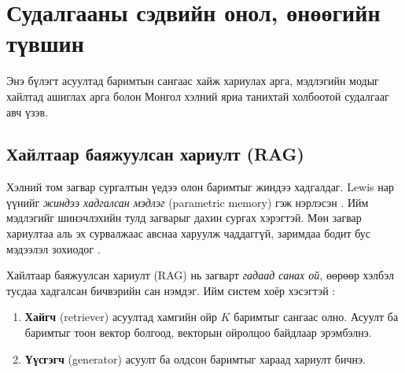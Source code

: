 \chapter{Судалгааны сэдвийн онол, өнөөгийн түвшин}
\label{ch:literature}

%

Энэ бүлэгт асуултад баримтын сангаас хайж хариулах арга, мэдлэгийн модыг хайлтад ашиглах арга болон Монгол хэлний яриа танихтай холбоотой судалгааг авч үзэв.

\section{Хайлтаар баяжуулсан хариулт (RAG)}
\label{sec:lit-rag}

Хэлний том загвар сургалтын үедээ олон баримтыг жиндээ хадгалдаг. Lewis нар үүнийг \textit{жиндээ хадгалсан мэдлэг} (parametric memory) гэж нэрлэсэн \cite{lewis2020rag}. Ийм мэдлэгийг шинэчлэхийн тулд загварыг дахин сургах хэрэгтэй. Мөн загвар хариултаа аль эх сурвалжаас авснаа харуулж чаддаггүй, заримдаа бодит бус мэдээлэл зохиодог \cite{lewis2020rag}.

Хайлтаар баяжуулсан хариулт (RAG) нь загварт \textit{гадаад санах ой}, өөрөөр хэлбэл тусдаа хадгалсан бичвэрийн сан нэмдэг. Ийм систем хоёр хэсэгтэй \cite{lewis2020rag}:
\begin{enumerate}
    \item \textbf{Хайгч} (retriever) асуултад хамгийн ойр $K$ баримтыг сангаас олно. Асуулт ба баримтыг тоон вектор болгоод, векторын ойролцоо байдлаар эрэмбэлнэ.
    \item \textbf{Үүсгэгч} (generator) асуулт ба олдсон баримтыг хараад хариулт бичнэ.
\end{enumerate}

